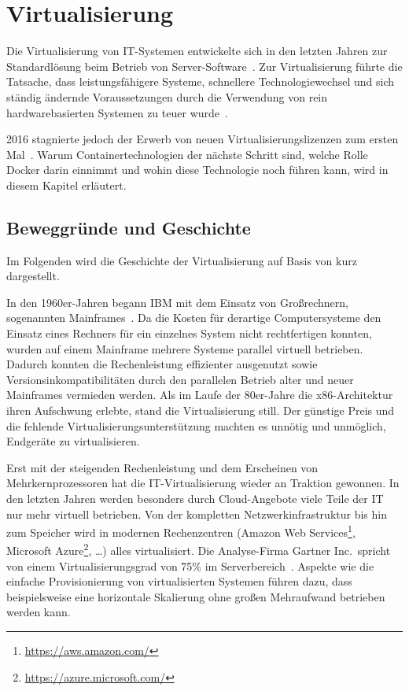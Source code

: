 \chapter{Virtualisierung}
\label{cha:virtualisierung}
Die Virtualisierung von IT-Systemen entwickelte sich in den letzten Jahren zur Standardlösung beim Betrieb von Server-Software~\autocite{Gartner-Magic-Quadrant2016:online}.
Zur Virtualisierung führte die Tatsache, dass leistungsfähigere Systeme, schnellere Technologiewechsel und sich ständig ändernde Voraussetzungen durch die Verwendung von rein hardwarebasierten Systemen zu teuer wurde~\autocite{vmware-virtualization-history:online}.

2016 stagnierte jedoch der Erwerb von neuen Virtualisierungslizenzen zum ersten Mal~\autocite{Gartner-Magic-Quadrant2016:online}.
Warum Containertechnologien der nächste Schritt sind, welche Rolle Docker darin einnimmt und wohin diese Technologie noch führen kann, wird in diesem Kapitel erläutert.
\section{Beweggründe und Geschichte}
\label{sec:virtualisierungsgeschichte}
Im Folgenden wird die Geschichte der Virtualisierung auf Basis von \autocite{Baun2009} kurz dargestellt.

In den 1960er-Jahren begann IBM mit dem Einsatz von Großrechnern, sogenannten Mainframes~\autocite{IBM1981}.
Da die Kosten für derartige Computersysteme den Einsatz eines Rechners für ein einzelnes System nicht rechtfertigen konnten, wurden auf einem Main\-frame mehrere Systeme parallel virtuell betrieben.
Dadurch konnten die Rechenleistung effizienter ausgenutzt sowie Versionsinkompatibilitäten durch den parallelen Betrieb alter und neuer Main\-frames vermieden werden.
Als im Laufe der 80er-Jahre die x86-Architektur ihren Aufschwung erlebte, stand die Virtualisierung still.
Der günstige Preis und die fehlende Virtualisierungsunterstützung machten es unnötig und unmöglich, Endgeräte zu virtualisieren.

Erst mit der steigenden Rechenleistung und dem Erscheinen von Mehrkernprozessoren hat die IT-Virtualisierung wieder an Traktion gewonnen.
In den letzten Jahren werden besonders durch Cloud-Angebote viele Teile der IT nur mehr virtuell betrieben.
Von der  kompletten Netzwerkinfrastruktur bis hin zum Speicher wird in modernen Rechenzentren (Amazon Web Services\footnote{\url{https://aws.amazon.com/}}, Microsoft Azure\footnote{\url{https://azure.microsoft.com/}}, \dots) alles virtualisiert.
Die Analyse-Firma Gartner Inc.\ spricht von einem Virtualisierungsgrad von 75\% im Serverbereich~\autocite{Gartner-Server-Virtualization:online}.
Aspekte wie die einfache Provisionierung von virtualisierten Systemen führen dazu, dass beispielsweise eine horizontale Skalierung ohne großen Mehraufwand betrieben werden kann.

